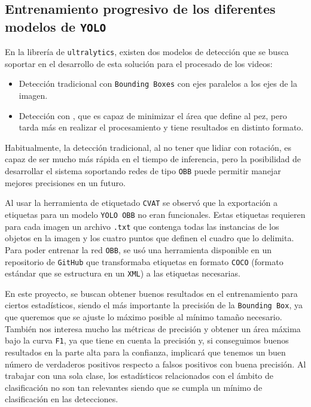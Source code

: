 \clearpage
\subsection{Entrenamiento progresivo de los diferentes modelos de \texttt{YOLO}}

En la librería de \texttt{ultralytics}, existen dos modelos de detección que se busca soportar en el desarrollo de esta solución para el procesado de los videos:

\begin{itemize}
    \item Detección tradicional con \texttt{Bounding Boxes} con ejes paralelos a los ejes de la imagen.
    \item Detección con , que es capaz de minimizar el área que define al pez, pero tarda más en realizar el procesamiento y tiene resultados en distinto formato.
\end{itemize}

Habitualmente, la detección tradicional, al no tener que lidiar con rotación, es capaz de ser mucho más rápida en el tiempo de inferencia, pero la posibilidad de desarrollar el sistema soportando redes de tipo \texttt{OBB} 
puede permitir manejar mejores precisiones en un futuro.

Al usar la herramienta de etiquetado \texttt{CVAT} se observó que la exportación a etiquetas para un modelo \texttt{YOLO OBB} no eran funcionales. Estas etiquetas requieren para cada imagen un archivo \texttt{.txt} que contenga 
todas las instancias de los objetos en la imagen y los cuatro puntos que definen el cuadro que lo delimita.\newline
Para poder entrenar la red \texttt{OBB}, se usó una herramienta disponible en un repositorio de \texttt{GitHub}\cite{kolesnikovKoldim2001COCO_to_YOLOv82024} que transformaba etiquetas en formato \texttt{COCO} (formato estándar 
que se estructura en un \texttt{XML}) a las etiquetas necesarias. 

En este proyecto, se buscan obtener buenos resultados en el entrenamiento para ciertos estadísticos, siendo el más importante la precisión de la \texttt{Bounding Box}, ya que queremos que se ajuste lo máximo posible al mínimo tamaño 
necesario. También nos interesa mucho las métricas de precisión y obtener un área máxima bajo la curva \texttt{F1}, ya que tiene en cuenta la precisión y, si conseguimos buenos resultados en la parte alta para la confianza, implicará 
que tenemos un buen número de verdaderos positivos respecto a falsos positivos con buena precisión. Al trabajar con una sola clase, los estadísticos relacionados con el ámbito de clasificación no son tan relevantes siendo que se 
cumpla un mínimo de clasificación en las detecciones.

